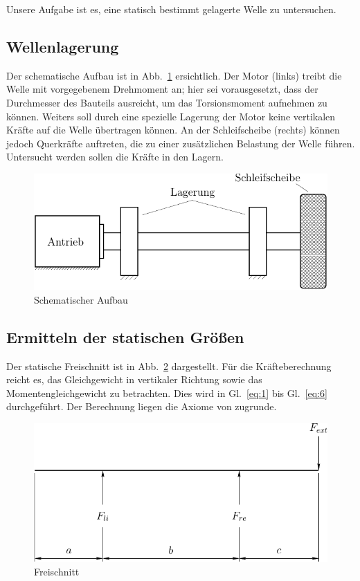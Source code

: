 \documentclass[
a4paper,     %
 headsepline, %
 halfparskip,     %
 fleqn,       %
12pt         %
]{scrartcl}  %
\begin{document}
Unsere Aufgabe ist es, eine statisch bestimmt gelagerte Welle zu untersuchen.

\subsection{Wellenlagerung}
\label{sec:wellenlagerung}

Der schematische Aufbau ist in Abb.~\ref{fig:schema} ersichtlich. Der Motor (links) treibt die Welle mit vorgegebenem Drehmoment an; hier sei vorausgesetzt, dass der Durchmesser des Bauteils ausreicht, um das Torsionsmoment aufnehmen zu können. Weiters soll durch eine spezielle Lagerung der Motor keine vertikalen Kräfte auf die Welle übertragen können. An der Schleifscheibe (rechts) können jedoch Querkräfte auftreten, die zu einer zusätzlichen Belastung der Welle führen. Untersucht werden sollen die Kräfte in den Lagern. 

\begin{figure}[bt]
  \centering
  \includegraphics{./images/schema}
  \caption[Welle: schematischer Aufbau]{Schematischer Aufbau}
  \label{fig:schema}
\end{figure}


\subsection{Ermitteln der statischen Größen}
\label{sec:ermitt-der-stat}

Der statische Freischnitt ist in Abb.~\ref{fig:freischnitt} dargestellt. Für die Kräfteberechnung reicht es, das Gleichgewicht in vertikaler Richtung sowie das Momentengleichgewicht zu betrachten. Dies wird in Gl.~\eqref{eq:1} bis Gl.~\eqref{eq:6} durchgeführt. Der Berechnung liegen die Axiome von \cite{newton} zugrunde.

\begin{figure}[bt]
  \centering
  \includegraphics{./images/statik}
  \caption[Welle: statischer Freischnitt]{Freischnitt}
  \label{fig:freischnitt}
\end{figure}
\end{document}
